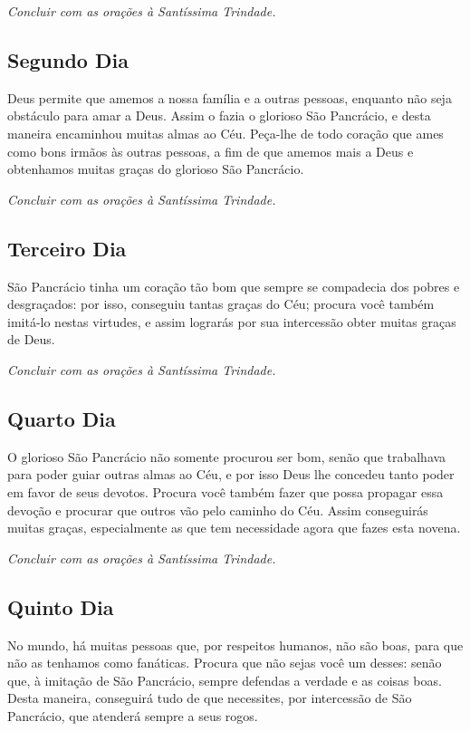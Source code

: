 \documentclass[18pt]{article}
\begin{document}
\textit{Concluir com as orações à Santíssima Trindade.}

\subsection*{Segundo Dia}
Deus permite que amemos a nossa família e a outras pessoas, enquanto não seja obstáculo para amar a Deus. Assim o fazia o glorioso São Pancrácio, e desta maneira encaminhou muitas almas ao Céu. Peça-lhe de todo coração que ames como bons irmãos às outras pessoas, a fim de que amemos mais a Deus e obtenhamos muitas graças do glorioso São Pancrácio.

\textit{Concluir com as orações à Santíssima Trindade.}

\subsection*{Terceiro Dia}
São Pancrácio tinha um coração tão bom que sempre se compadecia dos pobres e desgraçados: por isso, conseguiu tantas graças do Céu; procura você também imitá-lo nestas virtudes, e assim lograrás por sua intercessão obter muitas graças de Deus.

\textit{Concluir com as orações à Santíssima Trindade.}

\subsection*{Quarto Dia}
O glorioso São Pancrácio não somente procurou ser bom, senão que trabalhava para poder guiar outras almas ao Céu, e por isso Deus lhe concedeu tanto poder em favor de seus devotos. Procura você também fazer que possa propagar essa devoção e procurar que outros vão pelo caminho do Céu. Assim conseguirás muitas graças, especialmente as que tem necessidade agora que fazes esta novena.

\textit{Concluir com as orações à Santíssima Trindade.}

\subsection*{Quinto Dia}
No mundo, há muitas pessoas que, por respeitos humanos, não são boas, para que não as tenhamos como fanáticas. Procura que não sejas você um desses: senão que, à imitação de São Pancrácio, sempre defendas a verdade e as coisas boas. Desta maneira, conseguirá tudo de que necessites, por intercessão de São Pancrácio, que atenderá sempre a seus rogos.
\end{document}
